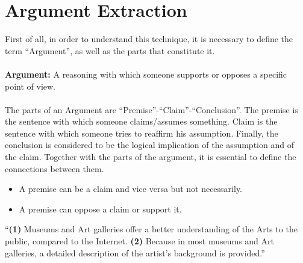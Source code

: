 \section{Argument Extraction}
First of all, in order to understand this technique, it is necessary to define the term ``Argument'', as well as the parts that constitute it.\\
\\
\textbf{Argument:} A reasoning with which someone supports or opposes a specific point of view.\\
\\
The parts of an Argument are ``Premise''-``Claim''-``Conclusion''. The premise is the sentence with which someone claims/assumes something. Claim is the sentence with which someone tries to reaffirm his assumption. Finally, the conclusion is considered to be the logical implication of the assumption and of the claim. Together with the parts of the argument, it is essential to define the connections between them.\cite{(6)}\cite{(7)}\\
\begin{itemize}

	\item A premise can be a claim and vice versa but not necessarily.
	\item A premise can oppose a claim or support it.\\

\end{itemize}

\begin{example}
``\textbf{(1)} Museums and Art galleries offer a better understanding of the Arts to the public, compared to the Internet. \textbf{(2)} Because in most museums and Art galleries, a detailed description of the artist's background is provided.''\\
\end{example}

